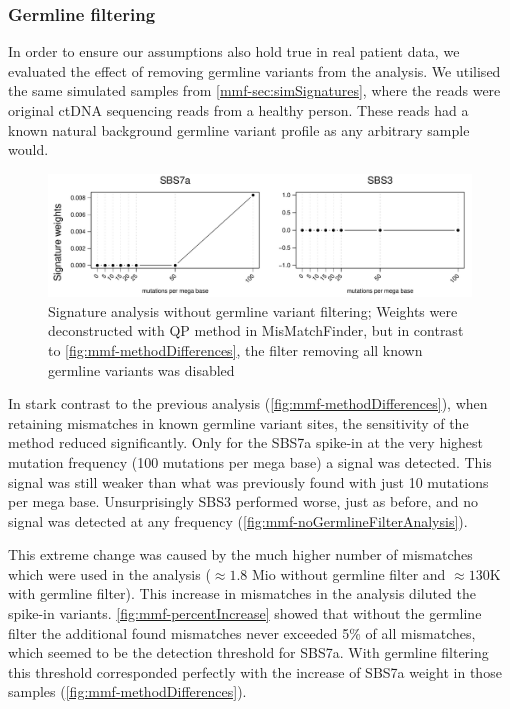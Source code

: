 \subsubsection{Germline filtering}
\label{mmf-sec:germlinefiltering}
In order to ensure our assumptions also hold true in real patient data, we evaluated the effect of removing germline variants from the analysis. We utilised the same simulated samples from \autoref{mmf-sec:simSignatures}, where the reads were original ctDNA sequencing reads from a healthy person. These reads had a known natural background germline variant profile as any arbitrary sample would.

\begin{figure}[ht]
\centering
\includegraphics[width=.99\linewidth]{Figures/MisMatchFinder/noGermlineFilterAnalysis.pdf}
\caption[Signature analysis without germline variant filtering]{Signature analysis without germline variant filtering; Weights were deconstructed with QP method in MisMatchFinder, but in contrast to \protect\autoref{fig:mmf-methodDifferences}, the filter removing all known germline variants was disabled}\label{fig:mmf-noGermlineFilterAnalysis}
\end{figure}

In stark contrast to the previous analysis (\autoref{fig:mmf-methodDifferences}), when retaining mismatches in known germline variant sites, the sensitivity of the method reduced significantly. Only for the SBS7a spike-in at the very highest mutation frequency (100 mutations per mega base) a signal was detected. This signal was still weaker than what was previously found with just 10 mutations per mega base. Unsurprisingly SBS3 performed worse, just as before, and no signal was detected at any frequency (\autoref{fig:mmf-noGermlineFilterAnalysis}).

This extreme change was caused by the much higher number of mismatches which were used in the analysis ($\approx 1.8$ Mio without germline filter and $\approx 130$K with germline filter).
This increase in mismatches in the analysis diluted the spike-in variants. \autoref{fig:mmf-percentIncrease} showed that without the germline filter the additional found mismatches never exceeded 5\% of all mismatches, which seemed to be the detection threshold for SBS7a. With germline filtering this threshold corresponded perfectly with the increase of SBS7a weight in those samples (\autoref{fig:mmf-methodDifferences}).

